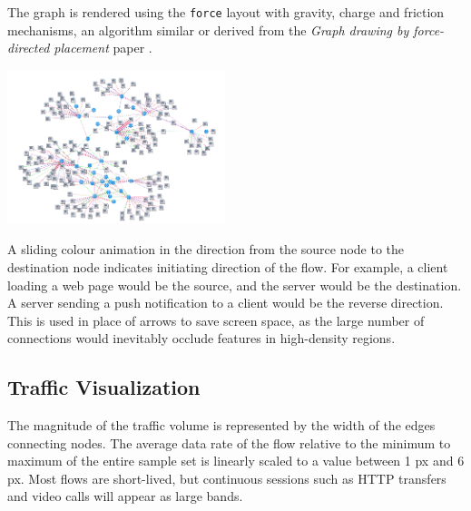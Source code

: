 \documentclass{vgtc}                          %
\begin{document}
The graph is rendered using the \texttt{force} layout with gravity, charge and friction mechanisms, an algorithm similar or derived from the \textit{Graph drawing by force-directed placement} paper \cite{graph-drawing-force}.

\begin{Figure}%
    \centering
    \includegraphics[width=240]{images/cs519-sv_course-project_network-graph.png}
    \label{fig:preproc-pipeline}
\end{Figure}

A sliding colour animation in the direction from the source node to the destination node indicates initiating direction of the flow. For example, a client loading a web page would be the source, and the server would be the destination. A server sending a push notification to a client would be the reverse direction. This is used in place of arrows to save screen space, as the large number of connections would inevitably occlude features in high-density regions.

\subsection{Traffic Visualization}

The magnitude of the traffic volume is represented by the width of the edges connecting nodes. The average data rate of the flow relative to the minimum to maximum of the entire sample set is linearly scaled to a value between 1 px and 6 px. Most flows are short-lived, but continuous sessions such as HTTP transfers and video calls will appear as large bands.
\end{document}
